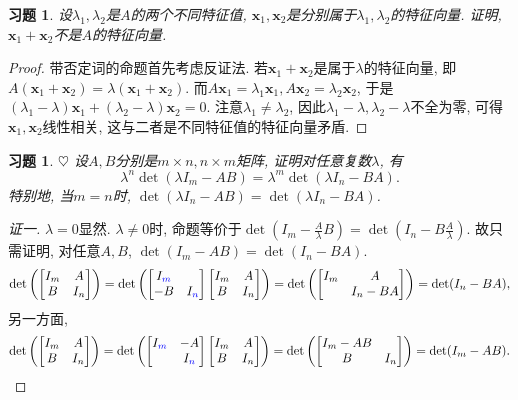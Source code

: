 \documentclass{ctexart}
\newtheorem{exercise}[thm]{习题}
\newcommand\bs[1]{\boldsymbol{ #1}}
\def\hard{$\heartsuit$}
\begin{document}
\begin{exercise}
设$\lambda_1, \lambda_2$是$A$的两个不同特征值, $\bs x_1, \bs x_2$是分别属于$\lambda_1, \lambda_2$的特征向量. 
证明, $\bs x_1+\bs x_2$不是$A$的特征向量. 
\end{exercise}
\begin{proof}
	带否定词的命题首先考虑反证法. 若$\bs x_1+\bs x_2$是属于$\lambda$的特征向量, 即$A(\bs x_1+\bs x_2)=\lambda(\bs x_1+\bs x_2)$. 而$A\bs x_1=\lambda_1\bs x_1, A\bs x_2=\lambda_2\bs x_2$, 于是$(\lambda_1-\lambda)\bs x_1+(\lambda_2-\lambda)\bs x_2=0$. 
	注意$\lambda_1\ne\lambda_2$, 因此$\lambda_1-\lambda,\lambda_2-\lambda$不全为零, 可得$\bs x_1,\bs x_2$线性相关, 这与二者是不同特征值的特征向量矛盾. 
\end{proof}

\begin{exercise} \hard
设$A, B$分别是$m\times n, n\times m$矩阵, 证明对任意复数$\lambda$, 有
\[
\lambda^n\det(\lambda I_m-AB)=\lambda^m\det(\lambda I_n-BA).
\]
特别地, 当$m=n$时, $\det(\lambda I_n-AB)=\det(\lambda I_n-BA)$. 
\end{exercise}
\begin{proof}[证一]
	$\lambda=0$显然. 
	$\lambda\ne 0$时, 命题等价于$
\det(I_m-\frac{A}{\lambda}B)=\det(I_n-B\frac{A}{\lambda})
$. 故只需证明, 对任意$A,B$, $
\det(I_m-AB)=\det(I_n-BA)
$. 
	\[
		\det\left( \begin{bmatrix}
			 I_m & A \\ B &  I_n
	\end{bmatrix} \right)
	=\det\left( \begin{bmatrix}
		I_{\color{blue}m} & \\ -B & I_{\color{blue}n}
	\end{bmatrix}\begin{bmatrix}
			 I_m & A \\ B &  I_n
	\end{bmatrix} \right)
	=\det\left( \begin{bmatrix}
			 I_m & A \\  &  I_n-BA
	\end{bmatrix} \right)
	=\det(I_n-BA),
	\]另一方面, 
	\[
		\det\left( \begin{bmatrix}
				 I_m & A \\ B &  I_n
		\end{bmatrix} \right)
		=\det\left( \begin{bmatrix}
			I_{\color{blue}m} & -A\\  & I_{\color{blue}n}
		\end{bmatrix}\begin{bmatrix}
				 I_m & A \\ B &  I_n
		\end{bmatrix} \right)
		=\det\left( \begin{bmatrix}
				 I_m-AB &  \\ B &  I_n
		\end{bmatrix} \right)
		=\det(I_m-AB).
	\]
\end{proof}
\end{document}
